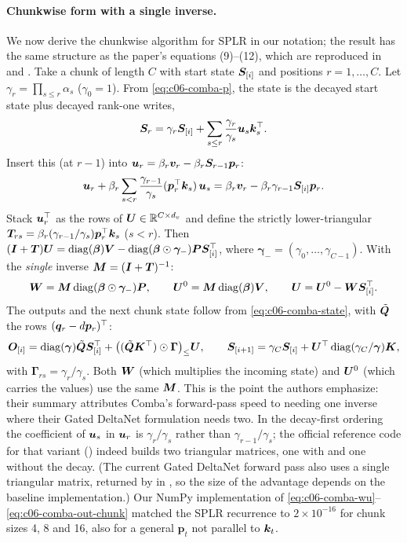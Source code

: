 \paragraph{Chunkwise form with a single inverse.}
We now derive the chunkwise algorithm for SPLR in our notation; the result has the same
structure as the paper's equations (9)--(12), which are reproduced in
 and .
Take a chunk of length $C$ with start state $\bm{S}_{[i]}$ and positions $r=1,\dots,C$. Let
$\gamma_r=\prod_{s\le r}\alpha_s$ ($\gamma_0=1$). From \eqref{eq:c06-comba-p}, the state is
the decayed start state plus decayed rank-one writes,
\begin{equation}\label{eq:c06-comba-state}
  \bm{S}_r=\gamma_r\bm{S}_{[i]}+\sum_{s\le r}\frac{\gamma_r}{\gamma_s}\bm{u}_s\bm{k}_s^{\top} .
\end{equation}
Insert this (at $r-1$) into $\bm{u}_r=\beta_r\bm{v}_r-\beta_r\bm{S}_{r-1}\bm{p}_r$:
\begin{equation}
  \bm{u}_r+\beta_r\sum_{s<r}\frac{\gamma_{r-1}}{\gamma_s}(\bm{p}_r^{\top}\bm{k}_s)\,\bm{u}_s
  =\beta_r\bm{v}_r-\beta_r\gamma_{r-1}\bm{S}_{[i]}\bm{p}_r .
\end{equation}
Stack $\bm{u}_r^{\top}$ as the rows of $\bm{U}\in\mathbb{R}^{C\times d_v}$ and define the strictly
lower-triangular $\bm{T}_{rs}=\beta_r(\gamma_{r-1}/\gamma_s)\bm{p}_r^{\top}\bm{k}_s$ ($s<r$). Then
$(\bm{I}+\bm{T})\bm{U}=\operatorname{diag}(\bm{\beta})\bm{V}-\operatorname{diag}(\bm{\beta}\odot\bm{\gamma}_{-})\bm{P}\bm{S}_{[i]}^{\top}$, where
$\bm{\gamma}_-=(\gamma_0,\dots,\gamma_{C-1})$. With the \emph{single} inverse
$\bm{M}=(\bm{I}+\bm{T})^{-1}$:
\begin{equation}\label{eq:c06-comba-wu}
  \bm{W}=\bm{M}\operatorname{diag}(\bm{\beta}\odot\bm{\gamma}_-)\bm{P},\qquad \bm{U}^{0}=\bm{M}\operatorname{diag}(\bm{\beta})\bm{V},\qquad
  \bm{U}=\bm{U}^{0}-\bm{W}\bm{S}_{[i]}^{\top} .
\end{equation}
The outputs and the next chunk state follow from \eqref{eq:c06-comba-state}, with
$\tilde{\bm{Q}}$ the rows $(\bm{q}_r-d\bm{p}_r)^{\top}$:
\begin{equation}\label{eq:c06-comba-out-chunk}
  \bm{O}_{[i]}=\operatorname{diag}(\bm{\gamma})\tilde{\bm{Q}}\bm{S}_{[i]}^{\top}+\big((\tilde{\bm{Q}}\bm{K}^{\top})\odot\bm{\Gamma}\big)_{\le}\bm{U},
  \qquad
  \bm{S}_{[i+1]}=\gamma_C\bm{S}_{[i]}+\bm{U}^{\top}\operatorname{diag}(\gamma_C/\bm{\gamma})\bm{K},
\end{equation}
with $\bm{\Gamma}_{rs}=\gamma_r/\gamma_s$. Both $\bm{W}$ (which multiplies the incoming state) and
$\bm{U}^0$ (which carries the values) use the same $\bm{M}$. This is the point the authors
emphasize: their summary attributes Comba's forward-pass speed to needing one inverse where
their Gated DeltaNet formulation needs two. In the decay-first ordering the coefficient of
$\bm{u}_s$ in $\bm{u}_r$ is $\gamma_r/\gamma_s$ rather than $\gamma_{r-1}/\gamma_s$; the official
reference code for that variant () indeed builds two triangular
matrices, one with and one without the decay. (The current \fla{} Gated DeltaNet forward pass also
uses a single triangular matrix, returned by  in
, so the size of the advantage depends on the baseline
implementation.) Our NumPy implementation of
\eqref{eq:c06-comba-wu}--\eqref{eq:c06-comba-out-chunk} matched the SPLR recurrence to
$2\times10^{-16}$ for chunk sizes 4, 8 and 16, also for a general $\bm{p}_t$ not parallel to
$\bm{k}_t$.

